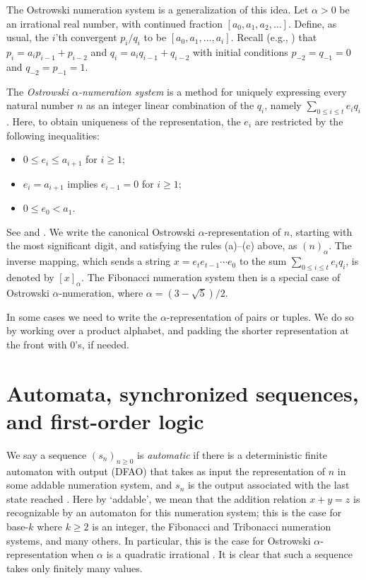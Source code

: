 \documentclass[12pt,reqno]{article}
\begin{document}
The Ostrowski numeration system is a generalization of this idea.
Let $ \alpha > 0$ be an irrational real number, with continued
fraction $[a_0, a_1, a_2, \ldots ]$.   Define, as usual, the
$i$'th convergent $p_i/q_i$ to be $[a_0, a_1, \ldots, a_i]$.
Recall (e.g., \cite{Hardy&Wright:1985}) that $p_i = a_i p_{i-1} + p_{i-2}$ and
$q_i = a_i q_{i-1} + q_{i-2}$ with initial conditions
$p_{-2} = q_{-1} = 0$ and $q_{-2} = p_{-1} = 1$.

The {\it Ostrowski $\alpha$-numeration system\/} is a method for
uniquely expressing every natural number $n$ as an integer linear
combination of the $q_i$, namely
$\sum_{0 \leq i \leq t} e_i q_i$. Here, to obtain uniqueness of the representation,  the $e_i$ are restricted by the following
inequalities:
\begin{itemize}
\item[(a)] $0 \leq e_i \leq a_{i+1}$ for $i \geq 1$;
\item[(b)] $e_i = a_{i+1}$ implies $e_{i-1} = 0$ for $i \geq 1$;
\item[(c)] $0 \leq e_0 < a_1$.
\end{itemize}
See \cite{Ostrowski:1922} and \cite[\S 3.9]{Allouche&Shallit:2003}.
We write the canonical Ostrowski $\alpha$-representation of $n$, starting with
the most significant digit, and satisfying the rules (a)--(c) above, as
$(n)_\alpha$.   The inverse mapping, which sends a string
$x = e_t e_{t-1} \cdots e_0$ to the sum $\sum_{0 \leq i \leq t} e_i q_i$,
is denoted by $[x]_\alpha$.  The Fibonacci numeration system then is
a special case of Ostrowski $\alpha$-numeration, where 
$\alpha = (3-\sqrt{5})/2$.

In some cases we need to write the $\alpha$-representation of pairs or
tuples.  We do so by working over a product alphabet, and padding the
shorter representation at the front with $0$'s, if needed.

\section{Automata, synchronized sequences, and first-order logic}
\label{synch}

We say a sequence $(s_n)_{n \geq 0}$ is {\it automatic\/} if there
is a deterministic finite automaton with output (DFAO) that takes
as input the representation of $n$ in some addable numeration system, and
$s_n$ is the output associated with the last state reached
\cite{Allouche&Shallit:2003}.  Here by `addable', we mean that the
addition relation $x+y=z$ is recognizable by an automaton
for this numeration system; this is the case for base-$k$ where $k\geq 2$
is an integer, the Fibonacci and Tribonacci numeration systems, and many
others.  In particular, this is the case for Ostrowski $\alpha$-representation
when $\alpha$ is a quadratic irrational \cite{Baranwal:2020,Baranwal&Schaeffer&Shallit:2021}.
It is clear that such a sequence takes only finitely many values.
\end{document}
